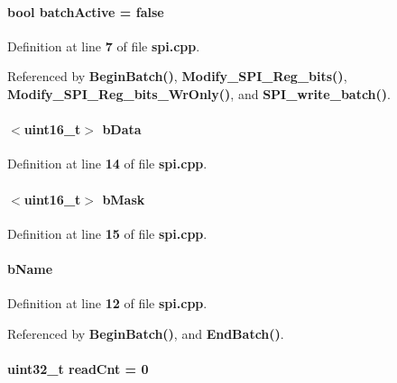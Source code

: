 \paragraph[{batch\+Active}]{\setlength{\rightskip}{0pt plus 5cm}bool batch\+Active = false}\label{spi_8cpp_ab37716ab32304630d6174a2666f40fd3}


Definition at line {\bf 7} of file {\bf spi.\+cpp}.



Referenced by {\bf Begin\+Batch()}, {\bf Modify\+\_\+\+S\+P\+I\+\_\+\+Reg\+\_\+bits()}, {\bf Modify\+\_\+\+S\+P\+I\+\_\+\+Reg\+\_\+bits\+\_\+\+Wr\+Only()}, and {\bf S\+P\+I\+\_\+write\+\_\+batch()}.

\paragraph[{b\+Data}]{$<$uint16\+\_\+t$>$ b\+Data}\label{spi_8cpp_a3683dd44d05092af9d46b8e58042498b}


Definition at line {\bf 14} of file {\bf spi.\+cpp}.

\paragraph[{b\+Mask}]{$<$uint16\+\_\+t$>$ b\+Mask}\label{spi_8cpp_a6a066d765bf05ceff2f022984ba19843}


Definition at line {\bf 15} of file {\bf spi.\+cpp}.

\paragraph[{b\+Name}]{ b\+Name}\label{spi_8cpp_af87b39d2cc0803a9cfa7cee57cf2ba00}


Definition at line {\bf 12} of file {\bf spi.\+cpp}.



Referenced by {\bf Begin\+Batch()}, and {\bf End\+Batch()}.

\paragraph[{read\+Cnt}]{\setlength{\rightskip}{0pt plus 5cm}uint32\+\_\+t read\+Cnt = 0}\label{spi_8cpp_a95e234fef53b4cfdb73195aa20ae4109}


